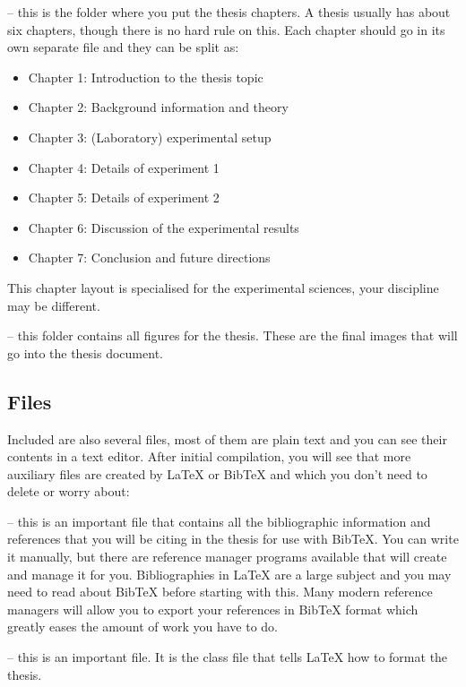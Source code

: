  -- this is the folder where you put the thesis chapters. A 
thesis usually has about six chapters, though there is no hard rule on this. 
Each chapter should go in its own separate  file and they can be 
split as:

\begin{itemize}
\item Chapter 1: Introduction to the thesis topic
\item Chapter 2: Background information and theory
\item Chapter 3: (Laboratory) experimental setup
\item Chapter 4: Details of experiment 1
\item Chapter 5: Details of experiment 2
\item Chapter 6: Discussion of the experimental results
\item Chapter 7: Conclusion and future directions
\end{itemize}

This chapter layout is specialised for the experimental sciences, your discipline 
may be different.

 -- this folder contains all figures for the thesis. These are 
the final images that will go into the thesis document.

\subsection{Files}

Included are also several files, most of them are plain text and you can see 
their contents in a text editor. After initial compilation, you will see that 
more auxiliary files are created by \LaTeX{} or BibTeX and which you don't need 
to delete or worry about:

 -- this is an important file that contains all the 
bibliographic information and references that you will be citing in the thesis 
for use with BibTeX. You can write it manually, but there are reference manager 
programs available that will create and manage it for you. Bibliographies in 
\LaTeX{} are a large subject and you may need to read about BibTeX before starting 
with this. Many modern reference managers will allow you to export your references 
in BibTeX format which greatly eases the amount of work you have to do.

 -- this is an important file. It is the class 
file that tells \LaTeX{} how to format the thesis. 

